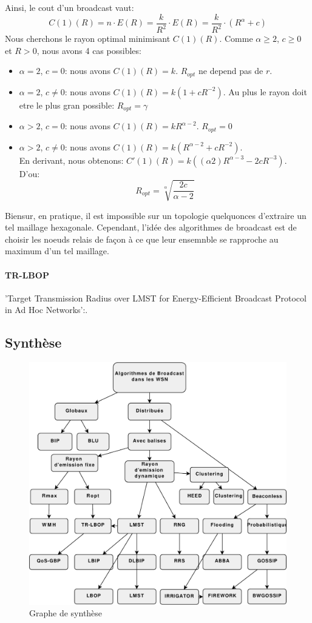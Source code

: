 Ainsi, le cout d'un broadcast vaut: $$C(1)(R)= n\cdot E(R)=\frac{k}{R^2}\cdot E(R)=\frac{k}{R^2}\cdot (R^\alpha+c)$$
Nous cherchons le rayon optimal minimisant $C(1)(R)$. Comme $\alpha\geq 2$, $c\geq 0$ et $R>0$, nous avons 4 cas possibles:
\begin{itemize}
 \item $\alpha=2$, $c=0$: nous avons $C(1)(R)=k$. $R_{opt}$ ne depend pas de $r$.
 \item $\alpha=2$, $c\neq0$: nous avons $C(1)(R)=k(1+cR^{-2})$. Au plus le rayon doit etre le plus gran possible: $R_{opt}=\gamma$
 \item $\alpha>2$, $c=0$: nous avons $C(1)(R)=kR^{\alpha-2}$. $R_{opt}=0$
 \item $\alpha>2$, $c\neq 0$: nous avons $C(1)(R)=k(R^{\alpha-2} + c R^{-2} ) $.\\
 En derivant, nous obtenons: $C'(1)(R)= k( (\alpha 2) R^{\alpha-3}- 2cR^{-3} ) $.\\
D'ou: $$R_{opt}=\sqrt[\alpha]{\frac{2c}{\alpha-2}}$$
\end{itemize}

Biensur, en pratique, il est impossible sur un topologie quelquonces d'extraire un tel maillage hexagonale. Cependant, l'idée des algorithmes de broadcast est de choisir les noeuds relais de façon à ce que leur ensemnble se rapproche 
au maximum d'un tel maillage.

\paragraph{TR-LBOP}
'Target Transmission Radius over LMST for Energy-Efficient Broadcast Protocol in Ad Hoc Networks':\cite{Ingelrest2004}.\\








\subsection{Synthèse}

\begin{figure}[H]
\centering
\includegraphics[scale=0.8]{Etat_de_l'art/source/classification}
\caption{ Graphe de synthèse}
\end{figure} 


